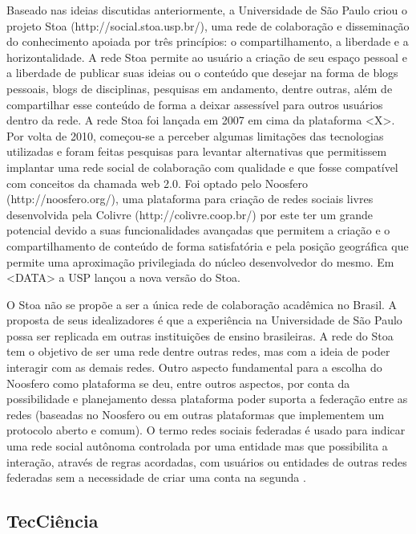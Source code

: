 Baseado nas ideias discutidas anteriormente, a Universidade de São Paulo criou o
projeto Stoa (http://social.stoa.usp.br/), uma rede de colaboração e disseminação
do conhecimento apoiada por três princípios: o compartilhamento, a liberdade e a
horizontalidade. A rede Stoa permite ao usuário a criação de seu espaço pessoal
e a  liberdade de publicar suas ideias ou o conteúdo que desejar na forma de
blogs pessoais, blogs de disciplinas, pesquisas em andamento, dentre outras,
além de compartilhar esse conteúdo de forma a deixar assessível para outros
usuários dentro da rede. A rede Stoa foi lançada em 2007
em cima da plataforma <X>. Por volta de 2010, começou-se a perceber algumas
limitações das tecnologias utilizadas e foram feitas pesquisas para levantar
alternativas que permitissem implantar uma rede social de colaboração com
qualidade e que fosse compatível com conceitos da chamada web 2.0. Foi optado
pelo Noosfero (http://noosfero.org/), uma plataforma para criação de redes sociais
livres desenvolvida pela Colivre (http://colivre.coop.br/) por este ter um grande
potencial devido a suas funcionalidades avançadas que permitem a criação e o
compartilhamento de conteúdo de forma satisfatória e pela posição geográfica que
permite uma aproximação privilegiada do núcleo desenvolvedor do mesmo. Em <DATA>
a USP lançou a nova versão do Stoa.

O Stoa não se propõe a ser a única rede de colaboração acadêmica no Brasil. A
proposta de seus idealizadores é que a experiência na Universidade de São Paulo
possa ser replicada em outras instituições de ensino brasileiras. A rede do Stoa
tem o objetivo de ser uma rede dentre outras redes, mas com a ideia de poder
interagir com as demais redes. Outro aspecto fundamental para a escolha do Noosfero
como plataforma se deu, entre outros aspectos, por conta da possibilidade e
planejamento dessa plataforma poder suporta a federação entre as redes (baseadas
no Noosfero ou em outras plataformas que implementem um protocolo aberto e comum).
O termo redes sociais federadas é usado para indicar uma rede social autônoma
controlada por uma entidade mas que possibilita a interação, através de regras
acordadas, com usuários ou entidades de outras redes federadas sem a necessidade
de criar uma conta na segunda \cite{heckert2010}.

\subsection{TecCiência}
